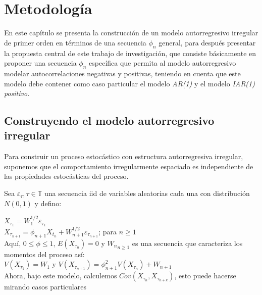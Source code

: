 \chapter{Metodología}

En este capítulo se presenta la construcción de un modelo autorregresivo irregular de primer orden en términos
 de una secuencia $\phi_{n}$ general, para después presentar la propuesta central
de este trabajo de investigación, que consiste básicamente en proponer una secuencia $\phi_{n}$ específica que permita
al modelo autorregresivo modelar autocorrelaciones negativas y positivas, teniendo en cuenta que este modelo
debe contener como caso particular el modelo \emph{AR(1)} y el modelo \emph{IAR(1) positivo}.

\section{Construyendo el modelo autorregresivo irregular}

Para construir un proceso estocástico con estructura autorregresiva irregular, suponemos que el comportamiento irregularmente espaciado es independiente de las propiedades estocásticas del proceso.

Sea ${\varepsilon_{\tau}, \tau \in \mathbb{T}}$ una secuencia iid de variables aleatorias cada una con distribución $N(0,1)$ y defino:

$X_{\tau_{1}} = W_1^{1/2} \varepsilon_{\tau_{1}}$\\ 
$X_{\tau_{n+1}} = \phi_{n+1} X_{t_n} +W_{n+1}^{1/2}\varepsilon_{\tau_{n+1}}$;    para $n \geq 1$\\

Aquí, $0 \leq \phi \leq 1$, $E(X_{\tau_{n}}) = 0$ y ${W_{n}}_{n\geq 1}$ es una secuencia que caracteriza los momentos del proceso así:\\

$V(X_{\tau_{1}})= W_1$ y $V(X_{\tau_{n+1}}) = \phi_{n+1}^{2}V(X_{\tau_{n}}) + W_{n+1}$\\

Ahora, bajo este modelo, calculemos $Cov(X_{\tau_{n}}, X_{\tau_{n+k}})$, esto puede hacerse mirando casos particulares

